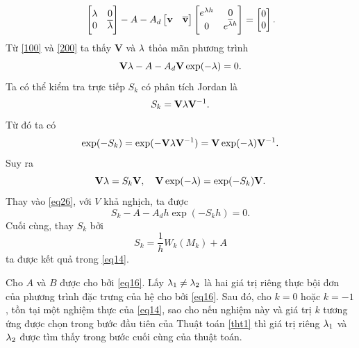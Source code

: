\begin{cm}
\begin{equation}
	\begin{bmatrix}
		\lambda & 0 \\ 0 & \overline{\lambda}
	\end{bmatrix}
	- A - A_d \begin{bmatrix}
		\mathbf{v}&\mathbf{\overline{v}}
	\end{bmatrix} \begin{bmatrix}
		e^{\lambda h } & 0 \\ 0 & e^{\overline{\lambda} h }
	\end{bmatrix} = \begin{bmatrix}
		0\\0
	\end{bmatrix}.
\end{equation}
Từ \eqref{100} và \eqref{200} ta thấy $\mathbf{V}$ và $\mathbf{\lambda}$  thỏa mãn phương trình
\begin{equation}\label{eq26}
	\mathbf{V} \mathbf{\lambda} - A - A_d \mathbf{V} \exp (-\mathbf{\lambda})=0.
\end{equation}
Ta có thể kiểm tra trực tiếp $S_k$ có phân tích Jordan là
\begin{equation}\label{eq27}
	S_k = \mathbf{V} \mathbf{\lambda} \mathbf{V}^{-1}.
\end{equation}
Từ đó ta có
\begin{equation}\label{eq28}
	\exp(-S_k) = \exp (-\mathbf{V} \mathbf{\lambda} \mathbf{V}^{-1}) = \mathbf{V} \exp(-\mathbf{\lambda}) \mathbf{V}^{-1}.
\end{equation}
Suy ra
\begin{equation}\label{eq29}
	\mathbf{V} \mathbf{\lambda} = S_k \mathbf{V}, \quad \mathbf{V} \exp(-\mathbf{\lambda}) = \exp(-S_k) \mathbf{V}.	
\end{equation}
Thay vào \eqref{eq26}, với $V$ khả nghịch, ta được
\begin{equation}\label{eq30}
	S_k -A - A_d h  \exp (-S_k h ) =0 .
\end{equation}
Cuối cùng, thay $S_k$ bởi 
\begin{equation}\label{eq31}
	S_k = \dfrac{1}{h }W_k(M_k)+A
\end{equation}
ta được kết quả trong \eqref{eq14}.\\
\end{cm}

\begin{dly}\label{dly22}
Cho $A$ và $B$ được cho bởi \eqref{eq16}. Lấy $\lambda_1 \ne \lambda_2$ là hai giá trị riêng thực bội đơn của phương trình đặc trưng của hệ cho bởi \eqref{eq16}. Sau đó, cho $k =0$ hoặc $k =-1$, tồn tại một nghiệm thực của \eqref{eq14}, sao cho nếu nghiệm này và giá trị $k$ tương ứng được chọn trong bước đầu tiên của Thuật toán \ref{tht1} thì giá trị riêng $\lambda_1$ và $\lambda_2$ được tìm thấy trong bước cuối cùng của thuật toán.
\end{dly}

